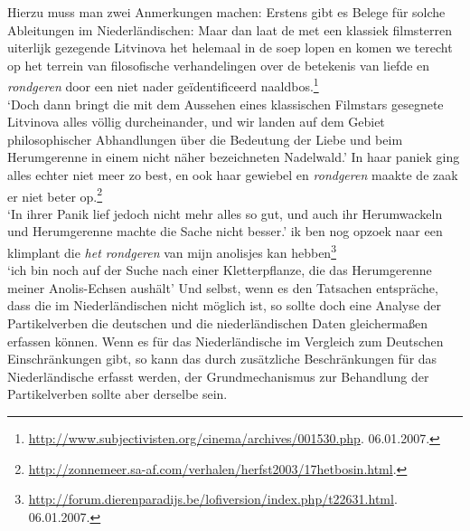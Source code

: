 Hierzu muss man zwei Anmerkungen machen: Erstens gibt es Belege für solche
Ableitungen im Niederländischen:
\eal
\ex Maar dan laat de met een klassiek filmsterren uiterlijk gezegende Litvinova het helemaal in de
soep lopen en komen we terecht op het terrein van filosofische verhandelingen over de betekenis van
liefde en \emph{rondgeren} door een niet nader geïdentificeerd naaldbos.\footnote{
\url{http://www.subjectivisten.org/cinema/archives/001530.php}. 06.01.2007.
}\\
`Doch dann bringt die mit dem Aussehen eines klassischen Filmstars gesegnete Litvinova alles
völlig durcheinander, und wir landen auf dem Gebiet philosophischer Abhandlungen über die Bedeutung
der Liebe und beim Herumgerenne in einem nicht näher bezeichneten Nadelwald.'
\ex In haar paniek ging alles echter niet meer zo best, en ook haar gewiebel en \emph{rondgeren} maakte de zaak er niet beter op.\footnote{
\url{http://zonnemeer.sa-af.com/verhalen/herfst2003/17hetbosin.html}.
}\\
`In ihrer Panik lief jedoch nicht mehr alles so gut, und auch ihr Herumwackeln und Herumgerenne machte die Sache nicht besser.'
\ex
ik ben nog opzoek naar een klimplant die 
\emph{het rondgeren} van mijn anolisjes kan hebben\footnote{
\url{http://forum.dierenparadijs.be/lofiversion/index.php/t22631.html}. 06.01.2007.
}\\
`ich bin noch auf der Suche nach einer Kletterpflanze, die das Herumgerenne meiner Anolis-Echsen aushält'
\zl
Und selbst, wenn es den Tatsachen entspräche, dass die \geen im Niederländischen nicht
möglich ist, so sollte doch eine Analyse der Partikelverben die deutschen und die niederländischen
Daten gleichermaßen erfassen können. Wenn es für das Niederländische im Vergleich zum Deutschen
Einschränkungen gibt, so kann das durch zusätzliche Beschränkungen für das Niederländische
erfasst werden, der Grundmechanismus zur Behandlung der Partikelverben sollte aber derselbe sein.

